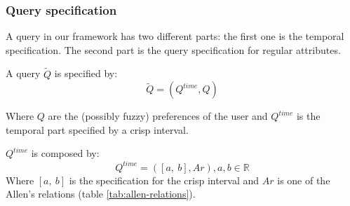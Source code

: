 \subsubsection{Query specification}
A query in our framework has two different parts: the first one is the temporal specification. The second part is the query specification for regular attributes.

\begin{definition}
A query $\tilde Q$ is specified by:
\begin{equation}
\label{eq:query-definition}
\tilde Q = \left( Q^{time}, Q \right)
\end{equation}
\end{definition}
Where $Q$ are the (possibly fuzzy) preferences of the user  and $Q^{time}$ is the temporal part specified by a crisp interval.
\begin{definition}
 $Q^{time}$ is composed by:
\begin{equation}
Q^{time} = \left( \left[a, \ b \right] , Ar \right), a,b \in \mathbb{R}
\end{equation}
Where $ \left[a, \ b \right] $ is the specification for the crisp interval and $Ar$ is one of the Allen's relations (table \ref{tab:allen-relations}).
\end{definition}


